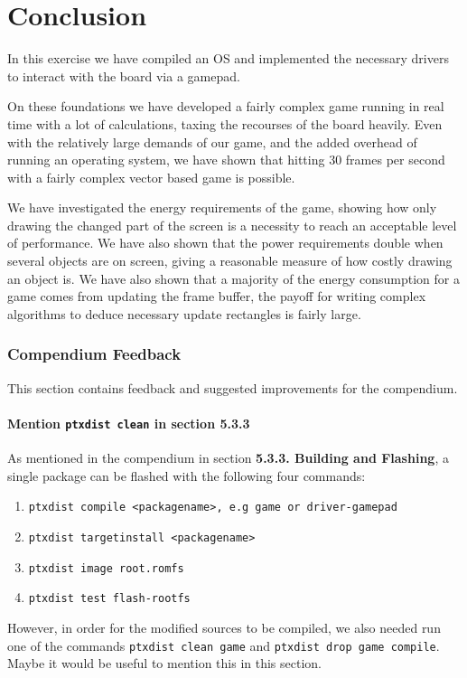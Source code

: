 \chapter{Conclusion}
In this exercise we have compiled an OS and implemented the necessary drivers to interact with the board via a gamepad. 

On these foundations we have developed a fairly complex game running in real time with a lot of calculations, taxing the recourses of the board heavily. Even with the relatively large demands of our game, and the added overhead of running an operating system, we have shown that hitting 30 frames per second with a fairly complex vector based game is possible.

We have investigated the energy requirements of the game, showing how only drawing the changed part of the screen is a necessity to reach an acceptable level of performance. We have also shown that the power requirements double when several objects are on screen, giving a reasonable measure of how costly drawing an object is. We have also shown that a majority of the energy consumption for a game comes from updating the frame buffer, the payoff for writing complex algorithms to deduce necessary update rectangles is fairly large.

\subsection{Compendium Feedback}
This section contains feedback and suggested improvements for the compendium.

\subsubsection{Mention \texttt{ptxdist clean} in section 5.3.3}
As mentioned in the compendium in section \textbf{5.3.3. Building and Flashing}, a single package can be flashed with the following four commands:
\begin{enumerate}
  \item \texttt{ptxdist compile <packagename>, e.g game or driver-gamepad}
  \item \texttt{ptxdist targetinstall <packagename>}
  \item \texttt{ptxdist image root.romfs}
  \item \texttt{ptxdist test flash-rootfs}
\end{enumerate}
However, in order for the modified sources to be compiled, we also needed run one of the commands \texttt{ptxdist clean game} and \texttt{ptxdist drop game compile}. Maybe it would be useful to mention this in this section.

